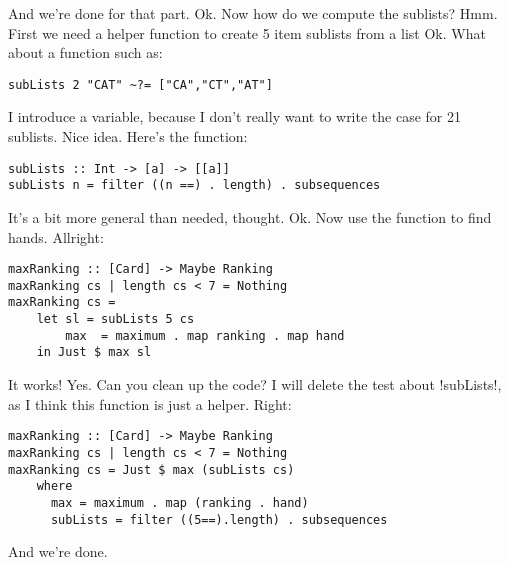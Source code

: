 \success And we're done for that part.
\lhN Ok. Now how do we compute the sublists?
\lhA Hmm. First we need a helper function to create 5 item sublists from a list
\lhN Ok. What about a function such as:
\begin{lstlisting}[frame=single]
subLists 2 "CAT" ~?= ["CA","CT","AT"]
\end{lstlisting}
I introduce a variable, because I don't really want to write the case for 21 sublists.
\lhA \error Nice idea. Here's the function:
\begin{lstlisting}[frame=single]
subLists :: Int -> [a] -> [[a]]
subLists n = filter ((n ==) . length) . subsequences 
\end{lstlisting}
\success It's a bit more general than needed, thought.
\lhN Ok. Now use the function to find hands.
\lhA Allright:
\begin{lstlisting}[frame=single]
maxRanking :: [Card] -> Maybe Ranking
maxRanking cs | length cs < 7 = Nothing
maxRanking cs = 
    let sl = subLists 5 cs
        max  = maximum . map ranking . map hand
    in Just $ max sl
\end{lstlisting} %
\success It works!
\lhN Yes. Can you clean up the code? I will delete the test about \il!subLists!, as I think this function is just a helper. 
\lhA Right:
\begin{lstlisting}[frame=single]
maxRanking :: [Card] -> Maybe Ranking
maxRanking cs | length cs < 7 = Nothing
maxRanking cs = Just $ max (subLists cs)
    where 
      max = maximum . map (ranking . hand)
      subLists = filter ((5==).length) . subsequences
\end{lstlisting} %
\success And we're done.

\lhend 
